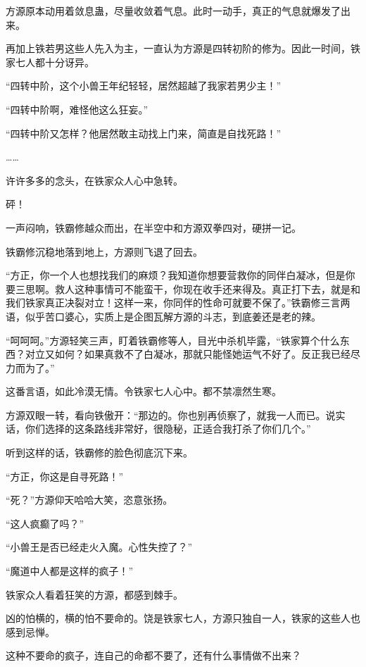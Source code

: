 
\begin{this_body}

方源原本动用着敛息蛊，尽量收敛着气息。此时一动手，真正的气息就爆发了出来。

再加上铁若男这些人先入为主，一直认为方源是四转初阶的修为。因此一时间，铁家七人都十分讶异。

“四转中阶，这个小兽王年纪轻轻，居然超越了我家若男少主！”

“四转中阶啊，难怪他这么狂妄。”

“四转中阶又怎样？他居然敢主动找上门来，简直是自找死路！”

……

许许多多的念头，在铁家众人心中急转。

砰！

一声闷响，铁霸修越众而出，在半空中和方源双拳四对，硬拼一记。

铁霸修沉稳地落到地上，方源则飞退了回去。

“方正，你一个人也想找我们的麻烦？我知道你想要营救你的同伴白凝冰，但是你要三思啊。救人这种事情可不能蛮干，你现在收手还来得及。真正打下去，就是和我们铁家真正决裂对立！这样一来，你同伴的性命可就要不保了。”铁霸修三言两语，似乎苦口婆心，实质上是企图瓦解方源的斗志，到底姜还是老的辣。

“呵呵呵。”方源轻笑三声，盯着铁霸修等人，目光中杀机毕露，“铁家算个什么东西？对立又如何？如果真救不了白凝冰，那就只能怪她运气不好了。反正我已经尽力而为了。”

这番言语，如此冷漠无情。令铁家七人心中。都不禁凛然生寒。

方源双眼一转，看向铁傲开：“那边的。你也别再侦察了，就我一人而已。说实话，你们选择的这条路线非常好，很隐秘，正适合我打杀了你们几个。”

听到这样的话，铁霸修的脸色彻底沉下来。

“方正，你这是自寻死路！”

“死？”方源仰天哈哈大笑，恣意张扬。

“这人疯癫了吗？”

“小兽王是否已经走火入魔。心性失控了？”

“魔道中人都是这样的疯子！”

铁家众人看着狂笑的方源，都感到棘手。

凶的怕横的，横的怕不要命的。饶是铁家七人，方源只独自一人，铁家的这些人也感到忌惮。

这种不要命的疯子，连自己的命都不要了，还有什么事情做不出来？


\end{this_body}
